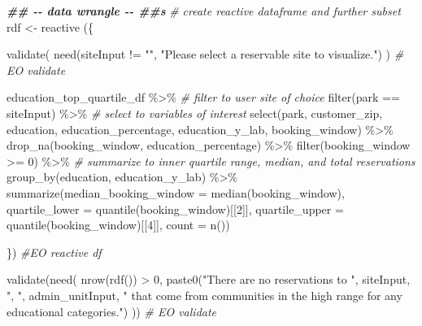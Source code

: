 \documentclass[
  11 pt,
  openany]{book}
\newenvironment{Shaded}{\begin{snugshade}}{\end{snugshade}}
\newcommand{\AttributeTok}[1]{\textcolor[rgb]{0.77,0.63,0.00}{#1}}
\newcommand{\CommentTok}[1]{\textcolor[rgb]{0.56,0.35,0.01}{\textit{#1}}}
\newcommand{\DecValTok}[1]{\textcolor[rgb]{0.00,0.00,0.81}{#1}}
\newcommand{\DocumentationTok}[1]{\textcolor[rgb]{0.56,0.35,0.01}{\textbf{\textit{#1}}}}
\newcommand{\FunctionTok}[1]{\textcolor[rgb]{0.00,0.00,0.00}{#1}}
\newcommand{\NormalTok}[1]{#1}
\newcommand{\OtherTok}[1]{\textcolor[rgb]{0.56,0.35,0.01}{#1}}
\newcommand{\SpecialCharTok}[1]{\textcolor[rgb]{0.00,0.00,0.00}{#1}}
\newcommand{\StringTok}[1]{\textcolor[rgb]{0.31,0.60,0.02}{#1}}
\begin{document}
\begin{Shaded}
\begin{Highlighting}[]
\DocumentationTok{\#\# {-}{-} data wrangle {-}{-} \#\#s}
\CommentTok{\# create reactive dataframe and further subset}
\NormalTok{rdf }\OtherTok{\textless{}{-}} \FunctionTok{reactive}\NormalTok{ (\{}
  
  \FunctionTok{validate}\NormalTok{(}
    \FunctionTok{need}\NormalTok{(siteInput }\SpecialCharTok{!=} \StringTok{""}\NormalTok{,}
         \StringTok{"Please select a reservable site to visualize."}\NormalTok{)}
\NormalTok{  ) }\CommentTok{\# EO validate}
  
\NormalTok{  education\_top\_quartile\_df }\SpecialCharTok{\%\textgreater{}\%}
    \CommentTok{\# filter to user site of choice}
    \FunctionTok{filter}\NormalTok{(park }\SpecialCharTok{==}\NormalTok{ siteInput) }\SpecialCharTok{\%\textgreater{}\%}
    \CommentTok{\# select to variables of interest}
    \FunctionTok{select}\NormalTok{(park, customer\_zip, }
\NormalTok{           education, education\_percentage, education\_y\_lab, }
\NormalTok{           booking\_window) }\SpecialCharTok{\%\textgreater{}\%} 
    \FunctionTok{drop\_na}\NormalTok{(booking\_window, education\_percentage) }\SpecialCharTok{\%\textgreater{}\%} 
    \FunctionTok{filter}\NormalTok{(booking\_window }\SpecialCharTok{\textgreater{}=} \DecValTok{0}\NormalTok{) }\SpecialCharTok{\%\textgreater{}\%} 
    \CommentTok{\# summarize to inner quartile range, median, and total reservations}
    \FunctionTok{group\_by}\NormalTok{(education, education\_y\_lab) }\SpecialCharTok{\%\textgreater{}\%} 
    \FunctionTok{summarize}\NormalTok{(}\AttributeTok{median\_booking\_window =} \FunctionTok{median}\NormalTok{(booking\_window),}
              \AttributeTok{quartile\_lower =} \FunctionTok{quantile}\NormalTok{(booking\_window)[[}\DecValTok{2}\NormalTok{]],}
              \AttributeTok{quartile\_upper =} \FunctionTok{quantile}\NormalTok{(booking\_window)[[}\DecValTok{4}\NormalTok{]],}
              \AttributeTok{count =} \FunctionTok{n}\NormalTok{())}
  
\NormalTok{\}) }\CommentTok{\#EO reactive df}

\FunctionTok{validate}\NormalTok{(}\FunctionTok{need}\NormalTok{(}
  \FunctionTok{nrow}\NormalTok{(}\FunctionTok{rdf}\NormalTok{()) }\SpecialCharTok{\textgreater{}} \DecValTok{0}\NormalTok{,}
  \FunctionTok{paste0}\NormalTok{(}\StringTok{"There are no reservations to "}\NormalTok{, siteInput, }\StringTok{", "}\NormalTok{, admin\_unitInput, }
         \StringTok{" that come from communities in the high range for any educational categories."}\NormalTok{)}
\NormalTok{)) }\CommentTok{\# EO validate}


\end{Highlighting}
\end{Shaded}
\end{document}
